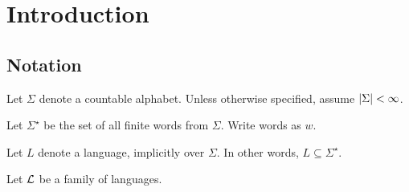\section{Introduction}

\subsection{Notation}

Let \(\Sigma\) denote a countable alphabet.
Unless otherwise specified, assume \(\left\lvert\Sigma\right\rvert < \infty\).

Let \(\Sigma^\star\) be the set of all finite words from \(\Sigma\).
Write words as \(w\).

Let \(L\) denote a language, implicitly over \(\Sigma\).
In other words, \(L \subseteq \Sigma^\star\).

Let \(\mathcal{L}\) be a family of languages.



